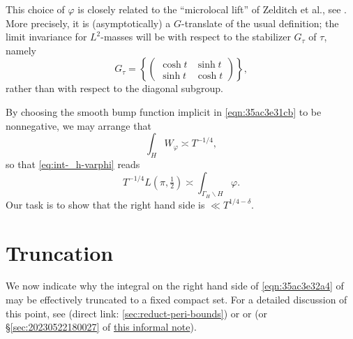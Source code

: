 \documentclass[reqno]{amsart} 
\numberwithin{equation}{section}
\numberwithin{theorem}{section}
\begin{document}
\begin{remark}
  This choice of $\varphi$ is closely related to the ``microlocal lift'' of Zelditch \cite{MR916129} et al., see \cite{MR1859345, MR2346281, MR2314452}.  More precisely, it is (asymptotically) a $G$-translate of the usual definition; the limit invariance for $L^2$-masses will be with respect to the stabilizer $G_\tau$ of $\tau$, namely
\begin{equation}\label{eqn:G-tau}
  G_\tau = \left\{ \begin{pmatrix}
      \cosh t & \sinh t \\
      \sinh t & \cosh t
    \end{pmatrix} \right\},
\end{equation}
rather than with respect to the diagonal subgroup.
\end{remark}

By choosing the smooth bump function implicit in \eqref{eqn:35ac3e31cb} to be nonnegative, we may arrange that
\begin{equation*}
  \int_{H} W_\varphi \asymp  T^{-1/4},
\end{equation*}
so that \eqref{eq:int-_h-varphi} reads
\begin{equation}\label{eqn:35ac3e32a4}
  T^{-1/4} L(\pi,\tfrac{1}{2}) \asymp  \int_{\Gamma_{H} \backslash H} \varphi.
\end{equation}
Our task is to show that the right hand side is $\ll T^{1/4-\delta}$.


\section{Truncation}\label{sec:orgc98f847}
We now indicate why the integral on the right hand side of \eqref{eqn:35ac3e32a4} of may be effectively truncated to a fixed compact set.  For a detailed discussion of this point, see \cite[\S5.3]{2021arXiv210915230N} (direct link: \ref{sec:reduct-peri-bounds}) or \cite[\S5.1.4]{michel-2009} or \cite[\S3]{2020arXiv200406791S} (or \S\ref{sec:20230522180027} of \href{20230522T174726__shrinking-archimedean-families-second-moment-gl2.pdf}{this informal note}).
\end{document}
